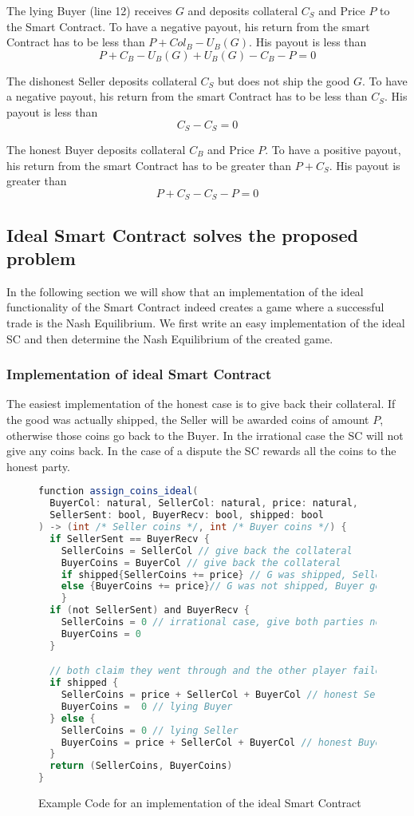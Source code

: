 \documentclass{cacthesis}
\begin{document}
The lying Buyer (line 12) receives $G$ and deposits collateral $C_S$ and Price $P$ to the Smart Contract. To have a negative payout, his return from the smart Contract has to be less than $P + Col_B - U_B(G)$. His payout is less than
\[P + C_B - U_B(G) + U_B(G) - C_B -P = 0\]

The dishonest Seller deposits collateral $C_S$ but does not ship the good $G$. To have a negative payout, his return from the smart Contract has to be less than $C_S$. His payout is less than
\[C_S - C_S = 0\]

The honest Buyer deposits collateral $C_B$ and Price $P$. To have a positive payout, his return from the smart Contract has to be greater than $P + C_S$. His payout is greater than
\[P + C_S - C_S - P = 0\]

\subsection{Ideal Smart Contract solves the proposed problem}
In the following section we will show that an implementation of the ideal functionality of the Smart Contract indeed creates a game where a successful trade is the Nash Equilibrium. We first write an easy implementation of the ideal SC and then determine the Nash Equilibrium of the created game.
\subsubsection{Implementation of ideal Smart Contract}
The easiest implementation of the honest case is to give back their collateral. If the good was actually shipped, the Seller will be awarded coins of amount $P$, otherwise those coins go back to the Buyer.
In the irrational case the SC will not give any coins back.
In the case of a dispute the SC rewards all the coins to the honest party.

\begin{figure}[htb!]
    \centering
\begin{lstlisting}[language=java]
function assign_coins_ideal(
  BuyerCol: natural, SellerCol: natural, price: natural,
  SellerSent: bool, BuyerRecv: bool, shipped: bool
) -> (int /* Seller coins */, int /* Buyer coins */) {
  if SellerSent == BuyerRecv { 
    SellerCoins = SellerCol // give back the collateral
    BuyerCoins = BuyerCol // give back the collateral
    if shipped{SellerCoins += price} // G was shipped, Seller gets price
    else {BuyerCoins += price}// G was not shipped, Buyer gets price
    }
  if (not SellerSent) and BuyerRecv { 
    SellerCoins = 0 // irrational case, give both parties no coins
    BuyerCoins = 0
  }

  // both claim they went through and the other player failed
  if shipped {
    SellerCoins = price + SellerCol + BuyerCol // honest Seller
    BuyerCoins =  0 // lying Buyer
  } else {
    SellerCoins = 0 // lying Seller
    BuyerCoins = price + SellerCol + BuyerCol // honest Buyer
  }
  return (SellerCoins, BuyerCoins)
}
\end{lstlisting}
    \caption{Example Code for an implementation of the ideal Smart Contract}
\end{figure}
\end{document}
